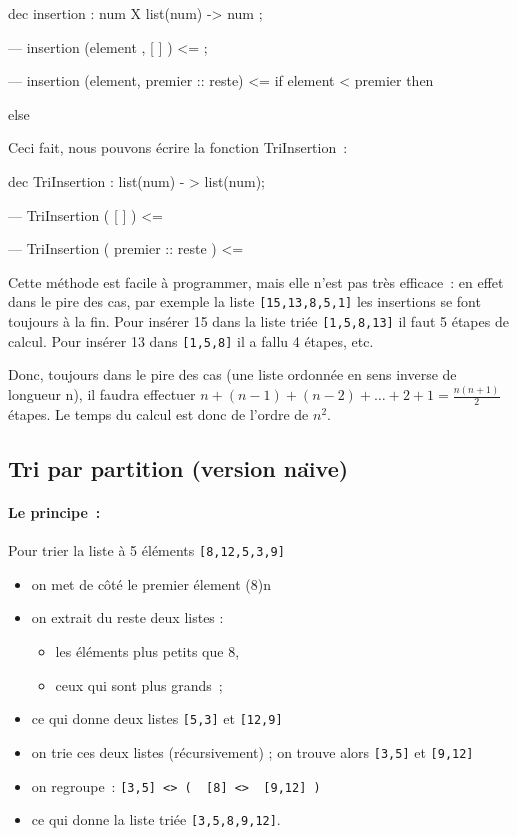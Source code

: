 \begin{verbatimtab}
dec insertion : num X list(num) -> num ;

--- insertion (element , [ ] ) 	<=			;

--- insertion (element, premier :: reste)  
                           <= if element < premier
                                 then

                                 else
 
\end{verbatimtab}

Ceci fait, nous pouvons écrire la fonction TriInsertion~:

\begin{verbatimtab}
dec TriInsertion : list(num) - > list(num);

--- TriInsertion ( [ ] )              <=

--- TriInsertion ( premier :: reste ) <= 

\end{verbatimtab}

Cette méthode est facile à programmer, mais elle n'est pas très
efficace~: en effet dans le pire des cas, par exemple la liste
\verb+[15,13,8,5,1]+ les insertions se font toujours à la fin. Pour insérer
15 dans la liste triée \verb+[1,5,8,13]+ il faut 5 étapes de calcul. Pour
insérer 13 dans \verb+[1,5,8]+ il a fallu 4 étapes, etc.

Donc, toujours dans le pire des cas (une liste ordonnée en sens
inverse de longueur n), il faudra effectuer $n+(n-1)+(n-2)+\ldots+2+1 =
\frac{n(n+1)}{2}$ étapes. Le temps du calcul est donc de l'ordre de $n^2$.

\subsection{Tri par partition (version na\"{\i}ve)}

\paragraph*{Le principe~:}  Pour trier la liste à 5 éléments 
\verb+[8,12,5,3,9]+
\begin{itemize}
\item on met de c\^oté le premier élement (8)n
\item on extrait du reste deux listes : 
\begin{itemize}
	\item les éléments plus petits que 8, 
	\item ceux qui sont plus grands~;
\end{itemize}
\item ce qui donne deux listes \verb+[5,3]+  et \verb+[12,9]+
\item on trie ces deux listes (récursivement) ; on trouve alors
\verb+[3,5]+ et \verb+[9,12]+
\item on regroupe~:  \verb+[3,5] <> (  [8] <>  [9,12] )+
\item ce qui donne la liste triée \verb+[3,5,8,9,12]+.
\end{itemize}

